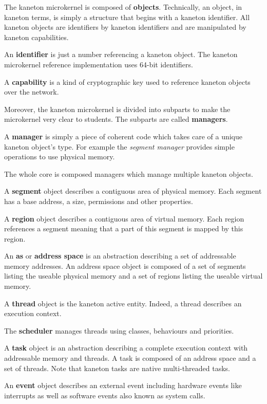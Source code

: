 The kaneton microkernel is composed of \textbf{objects}. Technically,
an object, in kaneton terms, is simply a structure that begins with
a kaneton identifier. All kaneton objects are identifiers by kaneton
identifiers and are manipulated by kaneton capabilities.

An \textbf{identifier} is just a number referencing a kaneton object.
The kaneton microkernel reference implementation uses 64-bit identifiers.

A \textbf{capability} is a kind of cryptographic key used to reference
kaneton objects over the network.

Moreover, the kaneton microkernel is divided into subparts to make the
microkernel very clear to students. The subparts are called \textbf{managers}.

A \textbf{manager} is simply a piece of coherent code which takes care
of a unique kaneton object's type. For example the \textit{segment manager}
provides simple operations to use physical memory.

The whole core is composed managers which manage multiple kaneton objects.

A \textbf{segment} object describes a contiguous area of physical memory.
Each segment has a base address, a size, permissions and other properties.

A \textbf{region} object describes a contiguous area of virtual memory.
Each region references a segment meaning that a part of this segment
is mapped by this region.

An \textbf{as} or \textbf{address space} is an abstraction describing
a set of addressable memory addresses. An address space object is composed
of a set of segments listing the useable physical memory and a set of
regions listing the useable virtual memory.

A \textbf{thread} object is the kaneton active entity. Indeed, a thread
describes an execution context.

The \textbf{scheduler} manages threads using classes, behaviours and
priorities.

A \textbf{task} object is an abstraction describing a complete execution
context with addressable memory and threads. A task is composed of
an address space and a set of threads. Note that kaneton tasks are
native multi-threaded tasks.

An \textbf{event} object describes an external event including hardware
events like interrupts as well as software events also known as system
calls.

